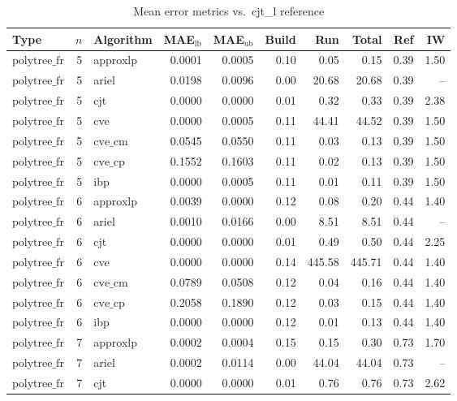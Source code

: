 \begin{table}[ht]
\centering
\scriptsize
\caption{Mean error metrics vs.\ cjt_l reference}
\begin{tabular}{lrlrrrrrrr}
\toprule
Type & $n$ & Algorithm & MAE$_{\text{lb}}$ & MAE$_{\text{ub}}$ & Build & Run & Total & Ref & IW \\
\midrule
$\text{polytree\_fr}$ & 5 & approxlp & 0.0001 & 0.0005 & 0.10 & 0.05 & 0.15 & 0.39 & 1.50 \\
$\text{polytree\_fr}$ & 5 & ariel & 0.0198 & 0.0096 & 0.00 & 20.68 & 20.68 & 0.39 & -- \\
$\text{polytree\_fr}$ & 5 & cjt & 0.0000 & 0.0000 & 0.01 & 0.32 & 0.33 & 0.39 & 2.38 \\
$\text{polytree\_fr}$ & 5 & cve & 0.0000 & 0.0005 & 0.11 & 44.41 & 44.52 & 0.39 & 1.50 \\
$\text{polytree\_fr}$ & 5 & $\text{cve\_cm}$ & 0.0545 & 0.0550 & 0.11 & 0.03 & 0.13 & 0.39 & 1.50 \\
$\text{polytree\_fr}$ & 5 & $\text{cve\_cp}$ & 0.1552 & 0.1603 & 0.11 & 0.02 & 0.13 & 0.39 & 1.50 \\
$\text{polytree\_fr}$ & 5 & ibp & 0.0000 & 0.0005 & 0.11 & 0.01 & 0.11 & 0.39 & 1.50 \\
$\text{polytree\_fr}$ & 6 & approxlp & 0.0039 & 0.0000 & 0.12 & 0.08 & 0.20 & 0.44 & 1.40 \\
$\text{polytree\_fr}$ & 6 & ariel & 0.0010 & 0.0166 & 0.00 & 8.51 & 8.51 & 0.44 & -- \\
$\text{polytree\_fr}$ & 6 & cjt & 0.0000 & 0.0000 & 0.01 & 0.49 & 0.50 & 0.44 & 2.25 \\
$\text{polytree\_fr}$ & 6 & cve & 0.0000 & 0.0000 & 0.14 & 445.58 & 445.71 & 0.44 & 1.40 \\
$\text{polytree\_fr}$ & 6 & $\text{cve\_cm}$ & 0.0789 & 0.0508 & 0.12 & 0.04 & 0.16 & 0.44 & 1.40 \\
$\text{polytree\_fr}$ & 6 & $\text{cve\_cp}$ & 0.2058 & 0.1890 & 0.12 & 0.03 & 0.15 & 0.44 & 1.40 \\
$\text{polytree\_fr}$ & 6 & ibp & 0.0000 & 0.0000 & 0.12 & 0.01 & 0.13 & 0.44 & 1.40 \\
$\text{polytree\_fr}$ & 7 & approxlp & 0.0002 & 0.0004 & 0.15 & 0.15 & 0.30 & 0.73 & 1.70 \\
$\text{polytree\_fr}$ & 7 & ariel & 0.0002 & 0.0114 & 0.00 & 44.04 & 44.04 & 0.73 & -- \\
$\text{polytree\_fr}$ & 7 & cjt & 0.0000 & 0.0000 & 0.01 & 0.76 & 0.76 & 0.73 & 2.62 \\

\end{tabular}
\end{table}
